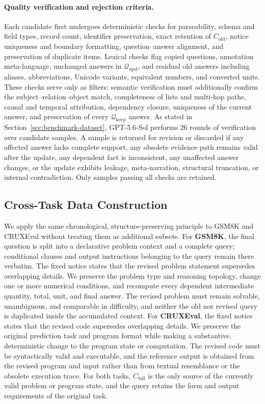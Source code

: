 \paragraph{Quality verification and rejection criteria.}
Each candidate first undergoes deterministic checks for parseability, schema and field types, record count, identifier preservation, exact retention of $C_{\mathrm{old}}$, notice uniqueness and boundary formatting, question--answer alignment, and preservation of duplicate items. Lexical checks flag copied questions, annotation meta-language, unchanged answers in $\mathcal{Q}_{\mathrm{upd}}$, and residual old answers including aliases, abbreviations, Unicode variants, equivalent numbers, and converted units. These checks serve only as filters: semantic verification must additionally confirm the subject--relation--object match, completeness of lists and multi-hop paths, causal and temporal attribution, dependency closure, uniqueness of the current answer, and preservation of every $\mathcal{Q}_{\mathrm{keep}}$ answer. As stated in Section~\ref{sec:benchmark-dataset}, GPT-5.6-Sol performs 26 rounds of verification over candidate samples. A sample is returned for revision or discarded if any affected answer lacks complete support, any obsolete evidence path remains valid after the update, any dependent fact is inconsistent, any unaffected answer changes, or the update exhibits leakage, meta-narration, structural truncation, or internal contradiction. Only samples passing all checks are retained.

\subsection{Cross-Task Data Construction}
\label{app:cross-task-annotation-guidelines}

We apply the same chronological, structure-preserving principle to GSM8K and CRUXEval without treating them as additional \benchmark{} subsets. For \textbf{GSM8K}, the final question is split into a declarative problem context and a complete query; conditional clauses and output instructions belonging to the query remain there verbatim. The fixed notice states that the revised problem statement supersedes overlapping details. We preserve the problem type and reasoning topology, change one or more numerical conditions, and recompute every dependent intermediate quantity, total, unit, and final answer. The revised problem must remain solvable, unambiguous, and comparable in difficulty, and neither the old nor revised query is duplicated inside the accumulated context. For \textbf{CRUXEval}, the fixed notice states that the revised code supersedes overlapping details. We preserve the original prediction task and program format while making a substantive, deterministic change to the program state or computation. The revised code must be syntactically valid and executable, and the reference output is obtained from the revised program and input rather than from textual resemblance or the obsolete execution trace. For both tasks, $C_{\mathrm{full}}$ is the only source of the currently valid problem or program state, and the query retains the form and output requirements of the original task.

